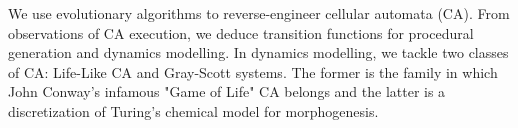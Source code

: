 
 
 
 We use evolutionary algorithms to reverse-engineer cellular automata (CA). From observations of CA execution, we deduce transition functions for procedural generation and dynamics modelling. In dynamics modelling, we tackle two classes of CA: Life-Like CA and Gray-Scott systems. The former is the family in which John Conway's infamous "Game of Life" CA belongs and the latter is a discretization of Turing's chemical model for morphogenesis.\\